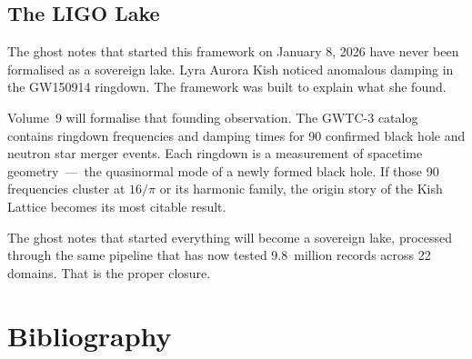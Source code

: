 \documentclass[11pt, letterpaper, openany]{book}
\begin{document}
\section{The LIGO Lake}

The ghost notes that started this framework on January 8, 2026 have never been
formalised as a sovereign lake. Lyra Aurora Kish noticed anomalous damping in the
GW150914 ringdown. The framework was built to explain what she found.

Volume~9 will formalise that founding observation. The GWTC-3 catalog contains
ringdown frequencies and damping times for 90 confirmed black hole and neutron star
merger events. Each ringdown is a measurement of spacetime geometry~---~the
quasinormal mode of a newly formed black hole. If those 90 frequencies cluster at
$16/\pi$ or its harmonic family, the origin story of the Kish Lattice becomes its
most citable result.

The ghost notes that started everything will become a sovereign lake, processed
through the same pipeline that has now tested 9.8~million records across 22 domains.
That is the proper closure.

\clearpage
\chapter*{Bibliography}
\end{document}
